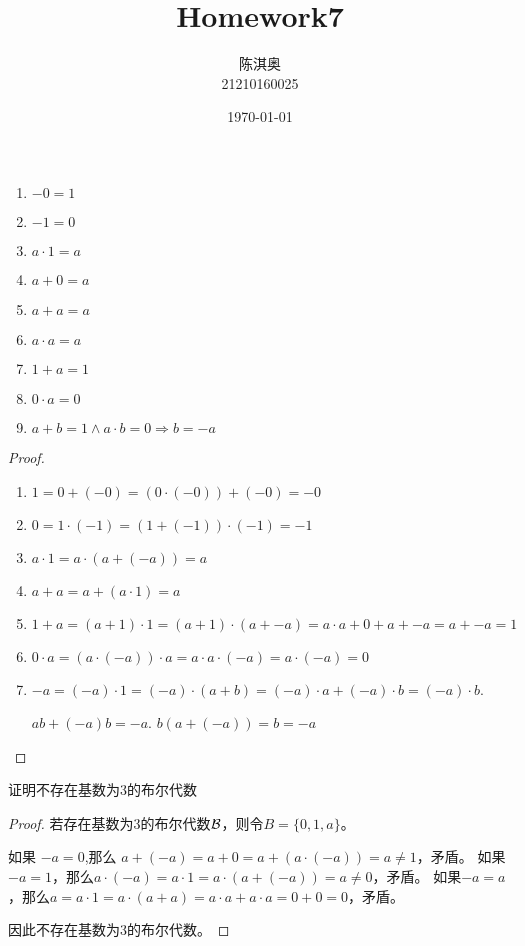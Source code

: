 \documentclass[11pt]{article}
\author{陈淇奥\\21210160025}
\date{\today}
\title{Homework7}
\begin{document}
\maketitle
\begin{lemma}[]
\begin{enumerate}
\item \(-0=1\)
\item \(-1=0\)
\item \(a\cdot 1=a\)
\item \(a+0=a\)
\item \(a+a=a\)
\item \(a\cdot a=a\)
\item \(1+a=1\)
\item \(0\cdot a=0\)
\item \(a+b=1\wedge a\cdot b=0\Rightarrow b=-a\)
\end{enumerate}
\end{lemma}

\begin{proof}
\begin{enumerate}
\item \(1=0+(-0)=(0\cdot(-0))+(-0)=-0\)
\item \(0=1\cdot(-1)=(1+(-1))\cdot(-1)=-1\)
\item \(a\cdot 1=a\cdot(a+(-a))=a\)
\setcounter{enumi}{4}
\item \(a+a=a+(a\cdot 1)=a\)
\setcounter{enumi}{6}
\item \(1+a=(a+1)\cdot 1=(a+1)\cdot(a+-a)=a\cdot a+0+a+-a=a+-a=1\)
\item \(0\cdot a=(a\cdot (-a))\cdot a=a\cdot a\cdot (-a)=a\cdot (-a)=0\)
\setcounter{enumi}{8}
\item \(-a=(-a)\cdot 1=(-a)\cdot(a+b)=(-a)\cdot a+(-a)\cdot b=(-a)\cdot b\).

\(ab+(-a)b=-a\). \(b(a+(-a))=b=-a\)
\end{enumerate}
\end{proof}

\begin{exercise}[]
证明不存在基数为3的布尔代数
\end{exercise}

\begin{proof}
若存在基数为3的布尔代数\(\mathcal{B}\)，则令\(B=\{0,1,a\}\)。

如果 \(-a=0\),那么 \(a+(-a)=a+0=a+(a\cdot(-a))=a\neq 1\)，矛盾。
如果\(-a=1\)，那么\(a\cdot(-a)=a\cdot 1=a\cdot(a+(-a))=a\neq 0\)，矛盾。
如果\(-a=a\)，那么\(a=a\cdot 1=a\cdot(a+a)=a\cdot a+a\cdot a=0+0=0\)，矛盾。

因此不存在基数为3的布尔代数。
\end{proof}
\end{document}
